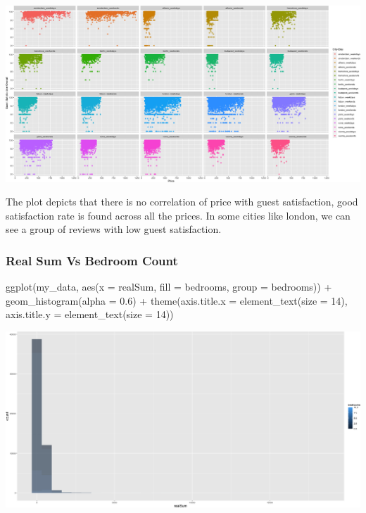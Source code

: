 \documentclass[
]{article}
\newenvironment{Shaded}{\begin{snugshade}}{\end{snugshade}}
\newcommand{\AttributeTok}[1]{\textcolor[rgb]{0.77,0.63,0.00}{#1}}
\newcommand{\DecValTok}[1]{\textcolor[rgb]{0.00,0.00,0.81}{#1}}
\newcommand{\FloatTok}[1]{\textcolor[rgb]{0.00,0.00,0.81}{#1}}
\newcommand{\FunctionTok}[1]{\textcolor[rgb]{0.00,0.00,0.00}{#1}}
\newcommand{\NormalTok}[1]{#1}
\newcommand{\SpecialCharTok}[1]{\textcolor[rgb]{0.00,0.00,0.00}{#1}}
\begin{document}
\includegraphics{Project_files/figure-latex/unnamed-chunk-24-2.png}

The plot depicts that there is no correlation of price with guest
satisfaction, good satisfaction rate is found across all the prices. In
some cities like london, we can see a group of reviews with low guest
satisfaction.

\hypertarget{real-sum-vs-bedroom-count}{%
\subsubsection{Real Sum Vs Bedroom
Count}\label{real-sum-vs-bedroom-count}}

\begin{Shaded}
\begin{Highlighting}[]
\FunctionTok{ggplot}\NormalTok{(my\_data, }\FunctionTok{aes}\NormalTok{(}\AttributeTok{x =}\NormalTok{ realSum, }\AttributeTok{fill =}\NormalTok{ bedrooms, }\AttributeTok{group =}\NormalTok{ bedrooms)) }\SpecialCharTok{+}
    \FunctionTok{geom\_histogram}\NormalTok{(}\AttributeTok{alpha =} \FloatTok{0.6}\NormalTok{) }\SpecialCharTok{+} \FunctionTok{theme}\NormalTok{(}\AttributeTok{axis.title.x =} \FunctionTok{element\_text}\NormalTok{(}\AttributeTok{size =} \DecValTok{14}\NormalTok{),}
    \AttributeTok{axis.title.y =} \FunctionTok{element\_text}\NormalTok{(}\AttributeTok{size =} \DecValTok{14}\NormalTok{))}
\end{Highlighting}
\end{Shaded}

\includegraphics{Project_files/figure-latex/unnamed-chunk-25-1.png}
\end{document}
